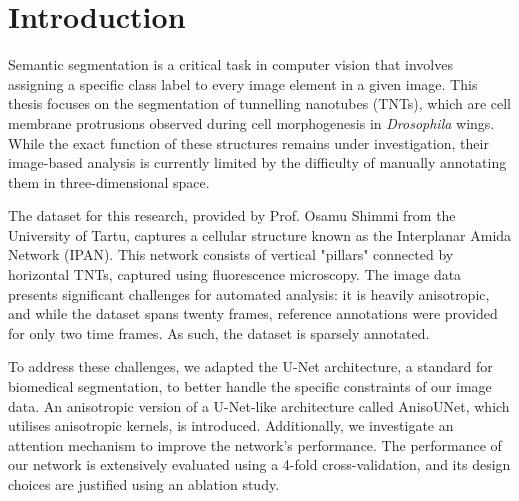 \documentclass[
  digital,     %
  oneside,     %
  nosansbold,  %
  nocolorbold, %
  lof,         %
  lot,         %
]{fithesis4}
\begin{document}
\chapter*{Introduction}

Semantic segmentation is a critical task in computer vision that involves assigning a specific class label to every image element in a given image. This thesis focuses on the segmentation of tunnelling nanotubes (TNTs), which are cell membrane protrusions observed during cell morphogenesis in \textit{Drosophila} wings. While the exact function of these structures remains under investigation, their image-based analysis is currently limited by the difficulty of manually annotating them in three-dimensional space.

The dataset for this research, provided by Prof. Osamu Shimmi from the University of Tartu, captures a cellular structure known as the Interplanar Amida Network (IPAN). This network consists of vertical "pillars" connected by horizontal TNTs, captured using fluorescence microscopy. The image data presents significant challenges for automated analysis: it is heavily anisotropic, and while the dataset spans twenty frames, reference annotations were provided for only two time frames. As such, the dataset is sparsely annotated.

To address these challenges, we adapted the U-Net architecture, a standard for biomedical segmentation, to better handle the specific constraints of our image data. An anisotropic version of a U-Net-like architecture called AnisoUNet, which utilises anisotropic kernels, is introduced. Additionally, we investigate an attention mechanism to improve the network's performance. The performance of our network is extensively evaluated using a 4-fold cross-validation, and its design choices are justified using an ablation study.
\end{document}
